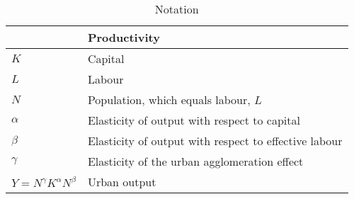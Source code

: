 \newpage
\begin{longtable}{lp{10cm}}
\caption{Notation}                \\

\hline           &  \textbf{Productivity} \\ \hline
$K$              &  Capital               \\ 
$L$              &  Labour                \\
$N$              &  Population, which equals labour, $L$ \\ 
$\alpha$         &  Elasticity of output with respect to capital          \\
$\beta$          &  Elasticity of output with respect to effective labour \\
$\gamma$         &  Elasticity of the urban agglomeration effect          \\ %
$Y=N^\gamma K^{\alpha }N^{\beta }$  &  Urban output                \\


\end{longtable}
